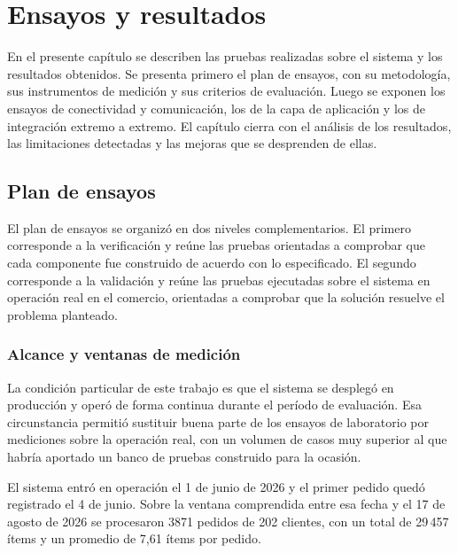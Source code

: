 
\chapter{Ensayos y resultados} %

\label{Chapter4} %

En el presente capítulo se describen las pruebas realizadas sobre el sistema y los resultados obtenidos. Se presenta primero el plan de ensayos, con su metodología, sus instrumentos de medición y sus criterios de evaluación. Luego se exponen los ensayos de conectividad y comunicación, los de la capa de aplicación y los de integración extremo a extremo. El capítulo cierra con el análisis de los resultados, las limitaciones detectadas y las mejoras que se desprenden de ellas.


\section{Plan de ensayos}
\label{sec:plan_ensayos}

El plan de ensayos se organizó en dos niveles complementarios. El primero corresponde a la verificación y reúne las pruebas orientadas a comprobar que cada componente fue construido de acuerdo con lo especificado. El segundo corresponde a la validación y reúne las pruebas ejecutadas sobre el sistema en operación real en el comercio, orientadas a comprobar que la solución resuelve el problema planteado.

\subsection{Alcance y ventanas de medición}
\label{subsec:alcance_medicion}

La condición particular de este trabajo es que el sistema se desplegó en producción y operó de forma continua durante el período de evaluación. Esa circunstancia permitió sustituir buena parte de los ensayos de laboratorio por mediciones sobre la operación real, con un volumen de casos muy superior al que habría aportado un banco de pruebas construido para la ocasión.

El sistema entró en operación el 1 de junio de 2026 y el primer pedido quedó registrado el 4 de junio. Sobre la ventana comprendida entre esa fecha y el 17 de agosto de 2026 se procesaron 3871 pedidos de 202 clientes, con un total de 29\,457 ítems y un promedio de 7,61 ítems por pedido.

